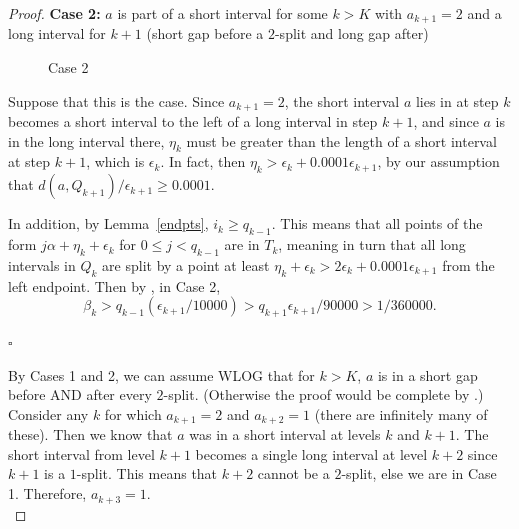 \documentclass[11pt,reqno]{amsart}
\theoremstyle{definition}
\theoremstyle{plain}
\begin{document}
\begin{proof}
\noindent
\textbf{Case 2:} $a$ is part of a short interval for some $k > K$ with $a_{k+1} = 2$ and a long interval for $k+1$ 
(short gap before a $2$-split and long gap after)\\

\begin{figure}[h]
\centering
{}
\caption{Case 2}\label{fig2}
\end{figure}

Suppose that this is the case. Since $a_{k+1} = 2$, the short interval $a$ lies in at step $k$ becomes a short interval to the left of a long interval in step $k+1$, and since $a$ is in the long interval there, $\eta_k$ must be greater than the length of a short interval at step $k+1$, which is $\epsilon_k$. In fact, then $\eta_k > \epsilon_k + 0.0001\epsilon_{k+1}$, by our assumption that $d(a, Q_{k+1})/\epsilon_{k+1} \geq 0.0001$. 

In addition, by Lemma~\ref{endpts}, $i_k \geq q_{k-1}$. This means that all points of the form $j\alpha + \eta_k + \epsilon_k$ for $0 \leq j < q_{k-1}$ are in $T_k$, meaning in turn that all long intervals in $Q_k$ are split by a point at least $\eta_k + \epsilon_k > 2\epsilon_k + 0.0001\epsilon_{k+1}$ from the left endpoint. Then by , in Case 2,
\[
\beta_k > q_{k-1}(\epsilon_{k+1}/10000) > q_{k+1} \epsilon_{k+1}/90000 > 1/360000.
\]
\begin{flushright}
    $\square$\\
\end{flushright}

By Cases 1 and 2, we can assume WLOG that for $k > K$, $a$ is in a short gap before AND after every $2$-split.
(Otherwise the proof would be complete by .)
Consider any $k$ for which $a_{k+1} = 2$ and $a_{k+2} = 1$ (there are infinitely many of these). Then we know that $a$ was in a short interval at levels $k$ and $k+1$. The short interval from level $k+1$ becomes a single long interval at level $k+2$ since $k+1$ is a $1$-split. This means that $k+2$ cannot be a $2$-split, else we are in Case 1. Therefore, 
$a_{k+3} = 1$. \\


\end{proof}
\end{document}
